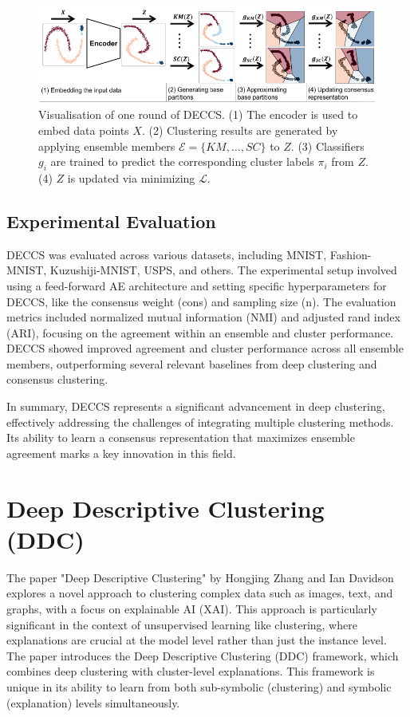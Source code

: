 \begin{figure}
\centering
\includegraphics[width=1\textwidth]{figs/deccs.png}
    \caption{Visualisation of one round of DECCS\citep{Miklautz2021}. (1) The encoder is used to embed data points $X$. (2) Clustering results are generated by applying ensemble members $\mathcal{E} = \{KM, \ldots, SC\}$ to $Z$. (3) Classifiers $g_i$ are trained to predict the corresponding cluster labels $\pi_i$ from $Z$. (4) $Z$ is updated via minimizing $\mathcal{L}$.}
\label{fig:pipeline}
\end{figure}

\subsection{Experimental Evaluation}

DECCS was evaluated across various datasets, including MNIST, Fashion-MNIST, Kuzushiji-MNIST, USPS, and others. The experimental setup involved using a feed-forward AE architecture and setting specific hyperparameters for DECCS, like the consensus weight (cons) and sampling size (n). The evaluation metrics included normalized mutual information (NMI) and adjusted rand index (ARI), focusing on the agreement within an ensemble and cluster performance. DECCS showed improved agreement and cluster performance across all ensemble members, outperforming several relevant baselines from deep clustering and consensus clustering.

In summary, DECCS represents a significant advancement in deep clustering, effectively addressing the challenges of integrating multiple clustering methods. Its ability to learn a consensus representation that maximizes ensemble agreement marks a key innovation in this field.

\section{Deep Descriptive Clustering (DDC)}

The paper "Deep Descriptive Clustering" \citep{Zhang2021} by Hongjing Zhang and Ian Davidson explores a novel approach to clustering complex data such as images, text, and graphs, with a focus on explainable AI (XAI). This approach is particularly significant in the context of unsupervised learning like clustering, where explanations are crucial at the model level rather than just the instance level. The paper introduces the Deep Descriptive Clustering (DDC) framework, which combines deep clustering with cluster-level explanations. This framework is unique in its ability to learn from both sub-symbolic (clustering) and symbolic (explanation) levels simultaneously.

